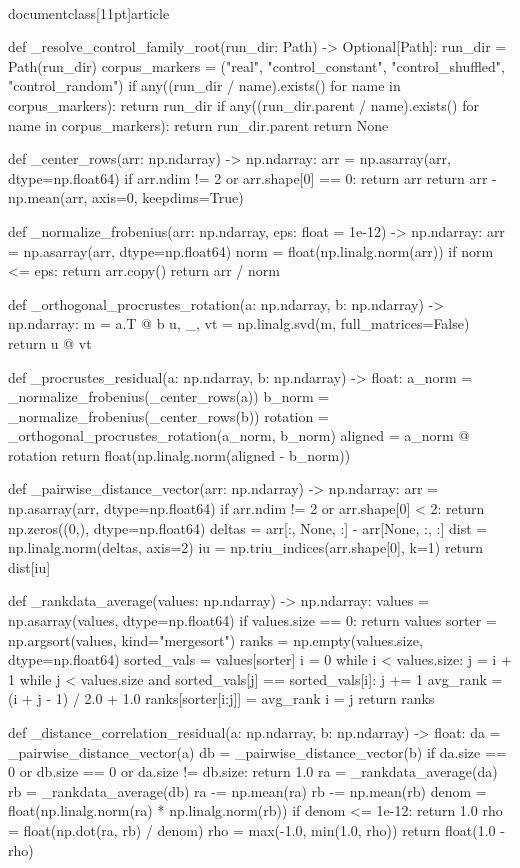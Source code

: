\\documentclass[11pt]{article}
\begin{document}
\begin{CodeBlock}
def _resolve_control_family_root(run_dir: Path) -> Optional[Path]:
    run_dir = Path(run_dir)
    corpus_markers = ("real", "control_constant", "control_shuffled", "control_random")
    if any((run_dir / name).exists() for name in corpus_markers):
        return run_dir
    if any((run_dir.parent / name).exists() for name in corpus_markers):
        return run_dir.parent
    return None


def _center_rows(arr: np.ndarray) -> np.ndarray:
    arr = np.asarray(arr, dtype=np.float64)
    if arr.ndim != 2 or arr.shape[0] == 0:
        return arr
    return arr - np.mean(arr, axis=0, keepdims=True)


def _normalize_frobenius(arr: np.ndarray, eps: float = 1e-12) -> np.ndarray:
    arr = np.asarray(arr, dtype=np.float64)
    norm = float(np.linalg.norm(arr))
    if norm <= eps:
        return arr.copy()
    return arr / norm


def _orthogonal_procrustes_rotation(a: np.ndarray, b: np.ndarray) -> np.ndarray:
    m = a.T @ b
    u, _, vt = np.linalg.svd(m, full_matrices=False)
    return u @ vt


def _procrustes_residual(a: np.ndarray, b: np.ndarray) -> float:
    a_norm = _normalize_frobenius(_center_rows(a))
    b_norm = _normalize_frobenius(_center_rows(b))
    rotation = _orthogonal_procrustes_rotation(a_norm, b_norm)
    aligned = a_norm @ rotation
    return float(np.linalg.norm(aligned - b_norm))


def _pairwise_distance_vector(arr: np.ndarray) -> np.ndarray:
    arr = np.asarray(arr, dtype=np.float64)
    if arr.ndim != 2 or arr.shape[0] < 2:
        return np.zeros((0,), dtype=np.float64)
    deltas = arr[:, None, :] - arr[None, :, :]
    dist = np.linalg.norm(deltas, axis=2)
    iu = np.triu_indices(arr.shape[0], k=1)
    return dist[iu]


def _rankdata_average(values: np.ndarray) -> np.ndarray:
    values = np.asarray(values, dtype=np.float64)
    if values.size == 0:
        return values
    sorter = np.argsort(values, kind="mergesort")
    ranks = np.empty(values.size, dtype=np.float64)
    sorted_vals = values[sorter]
    i = 0
    while i < values.size:
        j = i + 1
        while j < values.size and sorted_vals[j] == sorted_vals[i]:
            j += 1
        avg_rank = (i + j - 1) / 2.0 + 1.0
        ranks[sorter[i:j]] = avg_rank
        i = j
    return ranks


def _distance_correlation_residual(a: np.ndarray, b: np.ndarray) -> float:
    da = _pairwise_distance_vector(a)
    db = _pairwise_distance_vector(b)
    if da.size == 0 or db.size == 0 or da.size != db.size:
        return 1.0
    ra = _rankdata_average(da)
    rb = _rankdata_average(db)
    ra -= np.mean(ra)
    rb -= np.mean(rb)
    denom = float(np.linalg.norm(ra) * np.linalg.norm(rb))
    if denom <= 1e-12:
        return 1.0
    rho = float(np.dot(ra, rb) / denom)
    rho = max(-1.0, min(1.0, rho))
    return float(1.0 - rho)



\end{CodeBlock}
\end{document}
